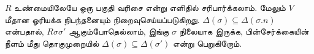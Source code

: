 \documentclass[../../../include/open-logic-section]{subfiles}
\begin{document}
$R$ உண்மையிலேயே ஒரு பகுதி வரிசை என்று எளிதில் சரிபார்க்கலாம். மேலும்
$V$ மீதான ஓரியக்க நிபந்தனையும் நிறைவுசெய்யப்படுகிறது.
$\Delta(\sigma) \subseteq \Delta(\sigma.n)$ என்பதால்,
$R\sigma\sigma'$ ஆகும்போதெல்லாம், இங்கு $\sigma$ நிலையாக இருக்க,
பின்சேர்க்கையின் நீளம் மீது தொகுமுறையில்
$\Delta(\sigma) \subseteq \Delta(\sigma')$ என்று பெறுகிறோம்.
\end{document}

